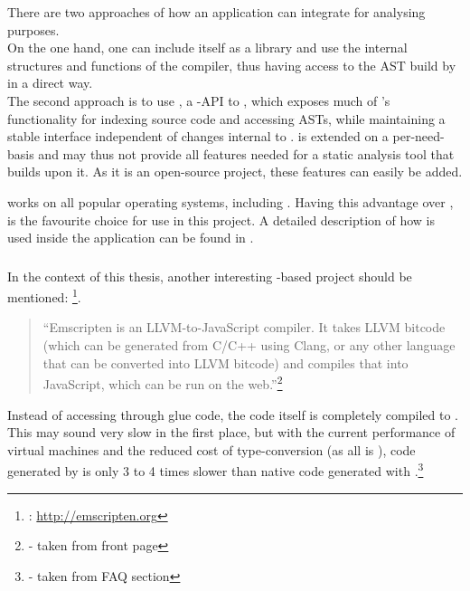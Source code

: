 There are two approaches of how an application can integrate  for analysing purposes.
\\On the one hand, one can include  itself as a library and use the internal structures and functions of the compiler, thus having access to the AST build by  in a direct way.
\\The second approach is to use , a -API to , which exposes much of 's functionality for indexing source code and accessing ASTs, while maintaining a stable interface independent of changes internal to .  is extended on a per-need-basis and may thus not provide all features needed for a static analysis tool that builds upon it. As it is an open-source project, these features can easily be added.

 works on all popular operating systems, including . Having this advantage over ,  is the favourite choice for use in this project. A detailed description of how  is used inside the application can be found in .

\subsubsection{}

In the context of this thesis, another interesting -based project should be mentioned: \footnote{: \url{http://emscripten.org}}. 

\begin{quotation}
``Emscripten is an LLVM-to-JavaScript compiler. It takes LLVM bitcode (which can be generated from C/C++ using Clang, or any other language that can be converted into LLVM bitcode) and compiles that into JavaScript, which can be run on the web.''\footnote{\citep{EmscriptenHP} - taken from front page}
\end{quotation}

Instead of accessing  through glue code, the  code itself is completely compiled to . This may sound very slow in the first place, but with the current performance of  virtual machines and the reduced cost of type-conversion (as all is ), code generated by  is only 3 to 4 times slower than native code generated with .\footnote{\citep{EmscriptenHP} - taken from FAQ section}